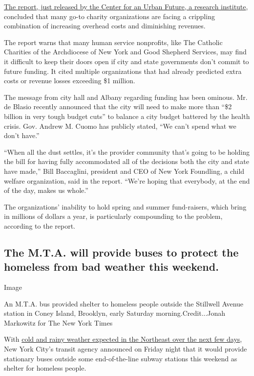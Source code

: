 \href{https://nycfuture.org/research/essential-yet-vulnerable}{The
report, just released by the Center for an Urban Future, a research
institute}, concluded that many go-to charity organizations are facing a
crippling combination of increasing overhead costs and diminishing
revenues.

The report warns that many human service nonprofits, like The Catholic
Charities of the Archdiocese of New York and Good Shepherd Services, may
find it difficult to keep their doors open if city and state governments
don't commit to future funding. It cited multiple organizations that had
already predicted extra costs or revenue losses exceeding \$1 million.

The message from city hall and Albany regarding funding has been
ominous. Mr. de Blasio recently announced that the city will need to
make more than ``\$2 billion in very tough budget cuts'' to balance a
city budget battered by the health crisis. Gov. Andrew M. Cuomo has
publicly stated, ``We can't spend what we don't have.''

``When all the dust settles, it's the provider community that's going to
be holding the bill for having fully accommodated all of the decisions
both the city and state have made,'' Bill Baccaglini, president and CEO
of New York Foundling, a child welfare organization, said in the report.
``We're hoping that everybody, at the end of the day, makes us whole.''

The organizations' inability to hold spring and summer fund-raisers,
which bring in millions of dollars a year, is particularly compounding
to the problem, according to the report.

\hypertarget{the-mta-will-provide-buses-to-protect-the-homeless-from-bad-weather-this-weekend}{%
\subsection{The M.T.A. will provide buses to protect the homeless from
bad weather this
weekend.}\label{the-mta-will-provide-buses-to-protect-the-homeless-from-bad-weather-this-weekend}}

Image

An M.T.A. bus provided shelter to homeless people outside the Stillwell
Avenue station in Coney Island, Brooklyn, early Saturday
morning.Credit...Jonah Markowitz for The New York Times

With
\href{https://www.nytimes3xbfgragh.onion/2020/05/07/us/northeast-polar-vortex-snow.html}{cold
and rainy weather expected in the Northeast over the next few days}, New
York City's transit agency announced on Friday night that it would
provide stationary buses outside some end-of-the-line subway stations
this weekend as shelter for homeless people.

